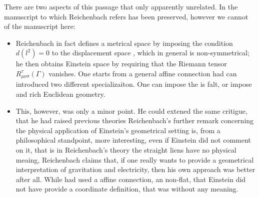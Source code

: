 \documentclass[draft]{article}
\begin{document}
There are two aspects of this passage that only apparently unrelated. In the manuscript to which Reichenbach refers has been preserved, however we cannot of the manuscript here:

\begin{itemize}
\item Reichenbach in fact defines a metrical space by imposing the condition $d(l^2)=0$ to the displacement space \Gtmn, which in general is non-symmetrical; he then obtains Einstein space by requiring that the Riemann tensor $R^\tau_{\mu\nu\sigma}(\Gamma)$ vanishes. One starts from a general affine connection had can introduced two different specializaiton. One can impose the is falt, or impose and rich Euclidean geometry. 

\item This, however, was only a minor point. He could extened the same critigue, that he had raised previous theories Reichenbach's further remark concerning the physical application of Einstein's geometrical setting is, from a philosophical standpoint, more interesting, even if Einstein did not comment on it, that is in Reichenbach's theory the straight liens have no physical meaing, Reichenbach claims that, if one really wants to provide a geometrical interpretation of gravitation and electricity, then his own approach was better after all.  While had used a affine connection, an non-flat, that Einstein did not have provide a coordinate definition, that was without any meaning.  
\end{itemize}





\end{document}
